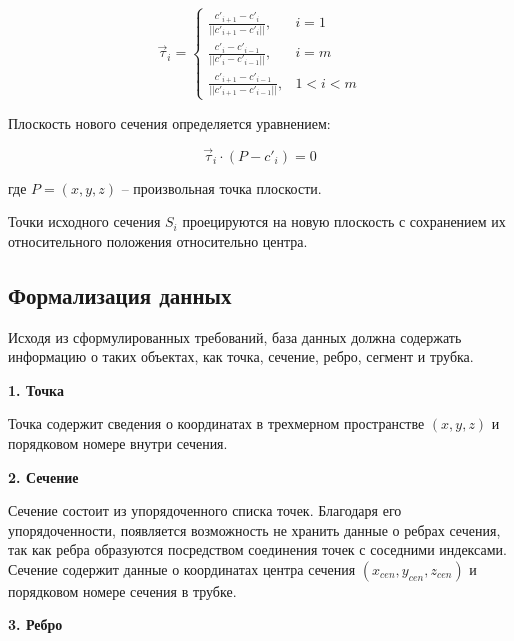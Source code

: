 \begin{equation}
\vec{\tau}_i = \begin{cases}
\frac{c'_{i+1} - c'_i}{||c'_{i+1} - c'_i||}, & i = 1 \\
\frac{c'_i - c'_{i-1}}{||c'_i - c'_{i-1}||}, & i = m \\
\frac{c'_{i+1} - c'_{i-1}}{||c'_{i+1} - c'_{i-1}||}, & 1 < i < m
\end{cases}
\end{equation}

\noindent
\hspace{1.25cm}
Плоскость нового сечения определяется уравнением:

\begin{equation}
\vec{\tau}_i \cdot (P - c'_i) = 0
\end{equation}

где $P = (x, y, z)$ -- произвольная точка плоскости.

\noindent
\hspace{1.25cm}
Точки исходного сечения $S_i$ проецируются на новую плоскость с сохранением их относительного положения относительно центра.

\subsection{Формализация данных}

\noindent
\hspace{1.25cm}
Исходя из сформулированных требований, база данных должна содержать информацию о таких объектах, как точка, сечение, ребро, сегмент и трубка.

\noindent
\hspace{1.25cm}
\textbf{1. Точка}

\noindent
\hspace{1.25cm}
Точка содержит сведения о координатах в трехмерном пространстве $(x, y, z)$ и порядковом номере внутри сечения.

\noindent
\hspace{1.25cm}
\textbf{2. Сечение}

\noindent
\hspace{1.25cm}
Сечение состоит из упорядоченного списка точек. Благодаря его упорядоченности, появляется возможность не хранить данные о ребрах сечения, так как ребра образуются посредством соединения точек с соседними индексами. Сечение содержит данные о координатах центра сечения $(x_{cen}, y_{cen}, z_{cen})$ и порядковом номере сечения в трубке.

\noindent
\hspace{1.25cm}
\textbf{3. Ребро}

